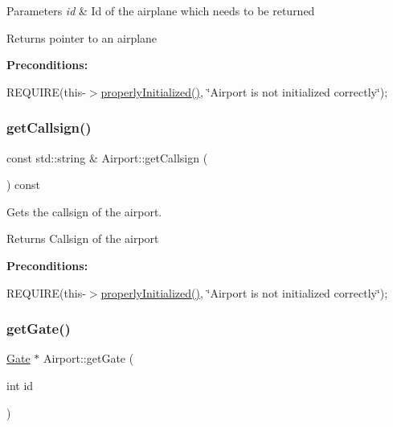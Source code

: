 \begin{DoxyParams}{Parameters}
{\em id} & Id of the airplane which needs to be returned \\
\hline
\end{DoxyParams}
\begin{DoxyReturn}{Returns}
pointer to an airplane
\end{DoxyReturn}
{\bfseries Preconditions\+:}
\begin{DoxyItemize}
\item R\+E\+Q\+U\+I\+RE(this-\/$>$\mbox{\hyperlink{class_airport_aa13e68ac58e8875837fbe888325cfff6}{properly\+Initialized()}}, \char`\"{}\+Airport is not initialized correctly\char`\"{}); 
\end{DoxyItemize}\mbox{\label{class_airport_a7fd582a5f9554830247f724ddc031d84}} 
\subsubsection{\texorpdfstring{get\+Callsign()}{getCallsign()}}
{\footnotesize\ttfamily const std\+::string \& Airport\+::get\+Callsign (\begin{DoxyParamCaption}{ }\end{DoxyParamCaption}) const}



Gets the callsign of the airport. 

\begin{DoxyReturn}{Returns}
Callsign of the airport
\end{DoxyReturn}
{\bfseries Preconditions\+:}
\begin{DoxyItemize}
\item R\+E\+Q\+U\+I\+RE(this-\/$>$\mbox{\hyperlink{class_airport_aa13e68ac58e8875837fbe888325cfff6}{properly\+Initialized()}}, \char`\"{}\+Airport is not initialized correctly\char`\"{}); 
\end{DoxyItemize}\mbox{\label{class_airport_a06570bd57b66959e22ec2fdbf24d3a36}} 
\subsubsection{\texorpdfstring{get\+Gate()}{getGate()}}
{\footnotesize\ttfamily \mbox{\hyperlink{class_gate}{Gate}} $\ast$ Airport\+::get\+Gate (\begin{DoxyParamCaption}\item[{int}]{id }\end{DoxyParamCaption})}



